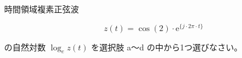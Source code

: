 \noindent 時間領域複素正弦波 

\[
z(t) = \cos(2) \cdot \textrm{e}^{\{ j \cdot 2\pi \cdot t \}}
\]

\bigskip
\noindent の自然対数 $\log_e z(t)$ を選択肢 a〜d の中から1つ選びなさい。
